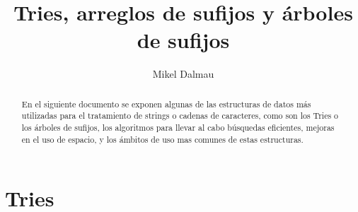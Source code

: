 \documentclass[es]{ifirak}
\begin{document}
\title{Tries, arreglos de sufijos y árboles de sufijos}
\author{Mikel Dalmau}

\maketitle

\begin{abstract}
	\large{
		En el siguiente documento se exponen algunas de las estructuras de datos más utilizadas para el tratamiento de strings o cadenas de caracteres, como son los Tries o los árboles de sufijos, los algoritmos para llevar al cabo búsquedas eficientes, mejoras en el uso de espacio, y los ámbitos de uso mas comunes de estas estructuras. 
}
\end{abstract}


\section{Tries}

\paragraph{}
\end{document}
